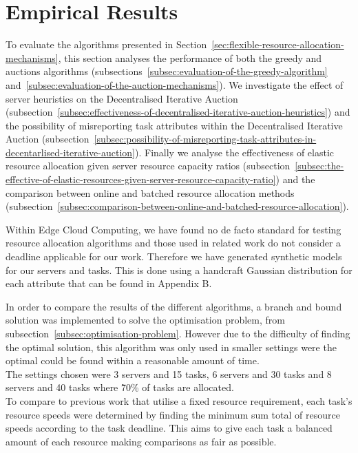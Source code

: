 \section{Empirical Results}
\label{sec:empirical-results}
To evaluate the algorithms presented in Section~\ref{sec:flexible-resource-allocation-mechanisms},
this section analyses the performance of both the greedy and auctions algorithms
(subsections~\ref{subsec:evaluation-of-the-greedy-algorithm} and~\ref{subsec:evaluation-of-the-auction-mechanisms}).
We investigate the effect of server heuristics on the Decentralised Iterative Auction
(subsection~\ref{subsec:effectiveness-of-decentralised-iterative-auction-heuristics}) and
the possibility of misreporting task attributes within the Decentralised Iterative Auction
(subsection~\ref{subsec:possibility-of-misreporting-task-attributes-in-decentarlised-iterative-auction}).
Finally we analyse the effectiveness of elastic resource allocation given server resource capacity ratios
(subsection~\ref{subsec:the-effective-of-elastic-resources-given-server-resource-capacity-ratio})
and the comparison between online and batched resource allocation methods
(subsection~\ref{subsec:comparison-between-online-and-batched-resource-allocation}).

Within Edge Cloud Computing, we have found no de facto standard for testing resource allocation algorithms and
those used in related work do not consider a deadline applicable for our work. Therefore we have generated synthetic
models for our servers and tasks. This is done using a handcraft Gaussian distribution for each attribute that can be
found in Appendix B\@.

In order to compare the results of the different algorithms, a branch and bound solution was implemented to solve
the optimisation problem, from subsection~\ref{subsec:optimisation-problem}. However due to the difficulty of
finding the optimal solution, this algorithm was only used in smaller settings were the optimal could be found within
a reasonable amount of time. \\
The settings chosen were 3 servers and 15 tasks, 6 servers and 30 tasks and 8 servers and 40 tasks where \~70\% of
tasks are allocated. \\
To compare to previous work that utilise a fixed resource requirement, each task's resource speeds were determined by
finding the minimum sum total of resource speeds according to the task deadline. This aims to give each task a
balanced amount of each resource making comparisons as fair as possible.

